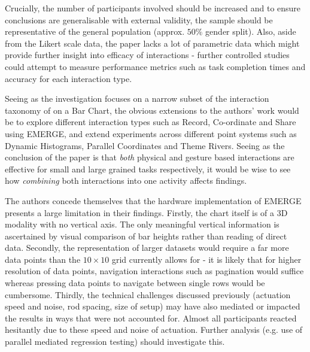 \documentclass[11pt]{article}
\begin{document}
Crucially, the number of participants involved should be increased and to ensure conclusions are generalisable with external validity, the sample should be representative of the general population (approx. $50\%$ gender split). Also, aside from the Likert scale data, the paper lacks a lot of parametric data which might provide further insight into efficacy of interactions - further controlled studies could attempt to measure performance metrics such as task completion times and accuracy for each interaction type.

Seeing as the investigation focuses on a narrow subset of the interaction taxonomy of \citet{heer2012} on a Bar Chart, the obvious extensions to the authors' work would be to explore different interaction types such as Record, Co-ordinate and Share using EMERGE, and extend experiments across different point systems such as Dynamic Histograms, Parallel Coordinates and Theme Rivers. Seeing as the conclusion of the paper is that \textit{both} physical and gesture based interactions are effective for small and large grained tasks respectively, it would be wise to see how \textit{combining} both interactions into one activity affects findings.

The authors concede themselves that the hardware implementation of EMERGE presents a large limitation in their findings. Firstly, the chart itself is of a 3D modality with no vertical axis. The only meaningful vertical information is ascertained by visual comparison of bar heights rather than reading of direct data. Secondly, the representation of larger datasets would require a far more data points than the $10\times10$ grid currently allows for - it is likely that for higher resolution of data points, navigation interactions such as pagination would suffice whereas pressing data points to navigate between single rows would be cumbersome. Thirdly, the technical challenges discussed previously (actuation speed and noise, rod spacing, size of setup) may have also mediated or impacted the results in ways that were not accounted for. Almost all participants reacted hesitantly due to these speed and noise of actuation. Further analysis (e.g. use of parallel mediated regression testing) should investigate this.
\end{document}
